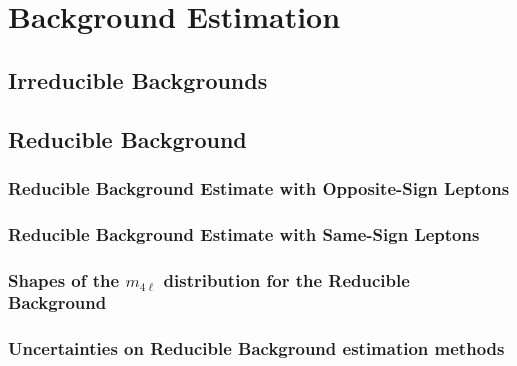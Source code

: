 \section{Background Estimation}

\subsection{Irreducible Backgrounds}
\label{sec:irrbkgd}


\clearpage

\subsection{Reducible Background}
\label{sec:zxIntr}



\subsubsection{Reducible Background Estimate with Opposite-Sign Leptons}
\label{sec:zxOS}



\clearpage

\subsubsection{Reducible Background Estimate with Same-Sign Leptons}
\label{sec:zxSS}


\subsubsection{Shapes of the $m_{4\ell}$ distribution for the Reducible Background}
\label{sec:zxShapes}



\subsubsection{Uncertainties on Reducible Background estimation methods} %
\label{sec:zxUncert}


